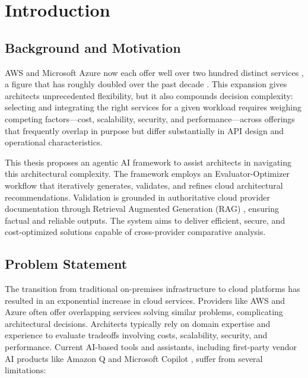 \chapter{Introduction}

\section{Background and Motivation}

AWS and Microsoft Azure now each offer well over two hundred distinct services \cite{aws2025catalog, azure2025catalog}, a figure that has roughly doubled over the past decade \cite{flexera2024cloud}. This expansion gives architects unprecedented flexibility, but it also compounds decision complexity: selecting and integrating the right services for a given workload requires weighing competing factors---cost, scalability, security, and performance---across offerings that frequently overlap in purpose but differ substantially in API design and operational characteristics.

This thesis proposes an agentic AI framework to assist architects in navigating this architectural complexity. The framework employs an Evaluator-Optimizer workflow \cite{anthropic2024agents} that iteratively generates, validates, and refines cloud architectural recommendations. Validation is grounded in authoritative cloud provider documentation through Retrieval Augmented Generation (RAG) \cite{lewis2020rag, asai2023selfrag}, ensuring factual and reliable outputs. The system aims to deliver efficient, secure, and cost-optimized solutions capable of cross-provider comparative analysis. %

\section{Problem Statement}

The transition from traditional on-premises infrastructure to cloud platforms has resulted in an exponential increase in cloud services. Providers like AWS and Azure often offer overlapping services solving similar problems, complicating architectural decisions. %
Architects typically rely on domain expertise and experience to evaluate tradeoffs involving costs, scalability, security, and performance. Current AI-based tools and assistants, including first-party vendor AI products like Amazon Q \cite{aws2023q} and Microsoft Copilot \cite{microsoft2024copilot}, suffer from several limitations:

